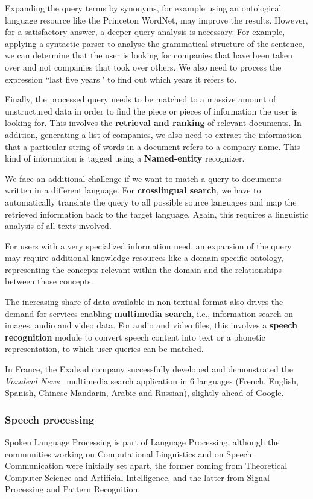 \documentclass[]{../metanetpaper}
\begin{document}
\begin{multicols}{2}
Expanding the query terms by synonyms, for example using an
ontological language resource like the Princeton WordNet, may improve
the results. However, for a satisfactory answer, a deeper query
analysis is necessary. For example, applying a syntactic parser to
analyse the grammatical structure of the sentence, we can determine
that the user is looking for companies that have been taken over and
not companies that took over others. We also need to process the
expression ``last five years{\mbox '}{\mbox '} to find out which years it refers to.

Finally, the processed query needs to be matched to a massive amount
of unstructured data in order to find the piece or pieces of
information the user is looking for. This involves the {\bf retrieval and
ranking} of relevant documents. In addition, generating a list of
companies, we also need to extract the information that a particular
string of words in a document refers to a company name. This kind of
information is tagged using a {\bf Named-entity} recognizer.

We face an additional challenge if we want to match a query to
documents written in a different language. For {\bf crosslingual search}, we
have to automatically translate the query to all possible source
languages and map the retrieved information back to the target
language. Again, this requires a linguistic analysis of all texts
involved.

For users with a very specialized information need, an expansion of
the query may require additional knowledge resources like a
domain-specific ontology, representing the concepts relevant within
the domain and the relationships between those concepts.

The increasing share of data available in non-textual format also
drives the demand for services enabling {\bf multimedia search}, i.e.,
information search on images, audio and video data. For audio and
video files, this involves a {\bf speech recognition} module to convert
speech content into text or a phonetic representation, to which user
queries can be matched.

In France, the Exalead company successfully developed and demonstrated
the {\em Voxalead News}~\cite{voxaleadnews} multimedia search application in 6 languages
(French, English, Spanish, Chinese Mandarin, Arabic and Russian),
slightly ahead of Google.

\subsubsection{Speech processing} 
Spoken Language Processing is part of Language Processing, although
the communities working on Computational Linguistics and on Speech
Communication were initially set apart, the former coming from
Theoretical Computer Science and Artificial Intelligence, and the
latter from Signal Processing and Pattern Recognition.


\end{multicols}
\end{document}
